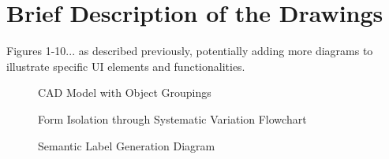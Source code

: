 \documentclass{article}
\begin{document}




\section{Brief Description of the Drawings}

Figures 1-10... as described previously, potentially adding more diagrams to illustrate specific UI elements and functionalities.

\begin{figure}
    \centering
    \caption{CAD Model with Object Groupings}
    \label{fig:cad_model_groupings}
\end{figure}

\begin{figure}
    \centering
    \caption{Form Isolation through Systematic Variation Flowchart}
    \label{fig:form_isolation_flowchart}
\end{figure}

\begin{figure}
    \centering
    \caption{Semantic Label Generation Diagram}
    \label{fig:semantic_label_generation}
\end{figure}
\end{document}
